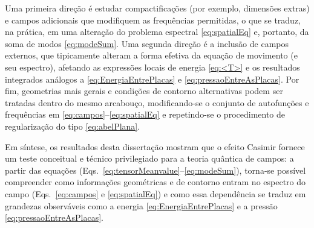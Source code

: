 Uma primeira direção é estudar compactificações (por exemplo, dimensões extras) e campos adicionais que modifiquem as frequências permitidas, o que se traduz, na prática, em uma alteração do problema espectral \eqref{eq:spatialEq} e, portanto, da soma de modos \eqref{eq:modeSum}. Uma segunda direção é a inclusão de campos externos, que tipicamente alteram a forma efetiva da equação de movimento (e seu espectro), afetando as expressões locais de energia \eqref{eq:<T>} e os resultados integrados análogos a \eqref{eq:EnergiaEntrePlacas} e \eqref{eq:pressaoEntreAsPlacas}. Por fim, geometrias mais gerais e condições de contorno alternativas podem ser tratadas dentro do mesmo arcabouço, modificando-se o conjunto de autofunções e frequências em \eqref{eq:campos}--\eqref{eq:spatialEq} e repetindo-se o procedimento de regularização do tipo \eqref{eq:abelPlana}. 

Em síntese, os resultados desta dissertação mostram que o efeito Casimir fornece um teste conceitual e técnico privilegiado para a teoria quântica de campos: a partir das equações (Eqs.~\eqref{eq:tensorMeanvalue}--\eqref{eq:modeSum}), torna-se possível compreender como informações geométricas e de contorno entram no espectro do campo (Eqs.~\eqref{eq:campos} e \eqref{eq:spatialEq}) e como essa dependência se traduz em grandezas observáveis como a energia \eqref{eq:EnergiaEntrePlacas} e a pressão \eqref{eq:pressaoEntreAsPlacas}.
